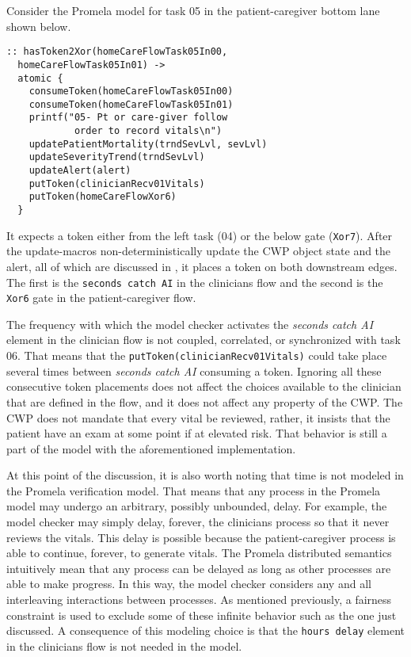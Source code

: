 Consider the Promela model for task 05 in the patient-caregiver bottom lane shown below.
%
{\small
\begin{lstlisting}[style=myPromela]
:: hasToken2Xor(homeCareFlowTask05In00, 
  homeCareFlowTask05In01) ->
  atomic {
    consumeToken(homeCareFlowTask05In00)
    consumeToken(homeCareFlowTask05In01)
    printf("05- Pt or care-giver follow
            order to record vitals\n")
    updatePatientMortality(trndSevLvl, sevLvl)
    updateSeverityTrend(trndSevLvl)
    updateAlert(alert)
    putToken(clinicianRecv01Vitals)
    putToken(homeCareFlowXor6)
  }
\end{lstlisting}
}
%
\noindent It expects a token either from the left task (04) or the below gate (\texttt{Xor7}). After the update-macros non-deterministically update the CWP object state and the alert, all of which are discussed in , it places a token on both downstream edges. The first is the \texttt{seconds catch AI} in the clinicians flow and the second is the \texttt{Xor6} gate in the patient-caregiver flow. 

The frequency with which the model checker activates the \emph{seconds catch AI} element in the clinician flow is not coupled, correlated, or synchronized with task 06. That means that the \texttt{putToken(clinicianRecv01Vitals)} could take place several times between \emph{seconds catch AI} consuming a token. Ignoring all these consecutive token placements does not affect the choices available to the clinician that are defined in the flow, and it does not affect any property of the CWP. The CWP does not mandate that every vital be reviewed, rather, it insists that the patient have an exam at some point if at elevated risk. That behavior is still a part of the model with the aforementioned implementation.

At this point of the discussion, it is also worth noting that time is not modeled in the Promela verification model. That means that any process in the Promela model may undergo an arbitrary, possibly unbounded, delay. For example, the model checker may simply delay, forever, the clinicians process so that it never reviews the vitals. This delay is possible because the patient-caregiver process is able to continue, forever, to generate vitals. The Promela distributed semantics intuitively mean that any process can be delayed as long as other processes are able to make progress. In this way, the model checker considers any and all interleaving interactions between processes. As mentioned previously, a fairness constraint is used to exclude some of these infinite behavior such as the one just discussed. A consequence of this modeling choice is that the \texttt{hours delay} element in the clinicians flow is not needed in the model.

